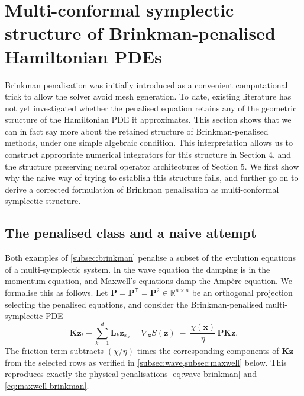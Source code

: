 \documentclass[11pt]{article}
\theoremstyle{definition}
\theoremstyle{remark}
\newcommand{\R}{\mathbb{R}}
\newcommand{\bz}{\bm{z}}
\newcommand{\bx}{\bm{x}}
\newcommand{\bK}{\bm{K}}
\newcommand{\bL}{\bm{L}}
\newcommand{\bP}{\bm{P}}
\newcommand{\chixx}{\chi(\bx)}
\begin{document}
\section{Multi-conformal symplectic structure of Brinkman-penalised
Hamiltonian PDEs}
\label{sec:structure}
Brinkman penalisation was initially introduced as a convenient computational trick to allow the solver avoid mesh generation. To date, existing literature has not yet investigated whether the penalised equation retains any of the geometric structure of the Hamiltonian PDE it approximates. This section shows that we can in fact say more about the retained structure of Brinkman-penalised methods, under one simple algebraic condition. This interpretation allows us to construct appropriate numerical integrators for this structure in Section 4, and the structure preserving neural operator architectures of Section 5. We first show why the naive way of trying to establish this structure fails, and further go on to derive a corrected formulation of Brinkman penalisation as multi-conformal symplectic structure.
\subsection{The penalised class and a naive attempt}
\label{subsec:class}

Both examples of \cref{subsec:brinkman} penalise a subset of
the evolution equations of a multi-symplectic system. In the wave
equation the damping is in the momentum equation, and Maxwell's equations damp the Amp\`ere equation.  We formalise this as follows.  Let $\bP=\bP^{\mathsf
T}=\bP^2\in\R^{n\times n}$ be an orthogonal projection selecting the
penalised equations, and consider the Brinkman-penalised
multi-symplectic PDE
\begin{equation}
\label{eq:penalised}
\bK\bz_t + \sum_{k=1}^{d}\bL_k\bz_{x_k}
= \nabla_{\bz}S(\bz) \;-\; \frac{\chixx}{\eta}\,\bP\bK\bz .
\end{equation}
The friction term subtracts $(\chi/\eta)$ times the corresponding
components of $\bK\bz$ from the selected rows as verified in
\cref{subsec:wave,subsec:maxwell} below. This reproduces exactly the
physical penalisations \eqref{eq:wave-brinkman} and
\eqref{eq:maxwell-brinkman}.
\end{document}
